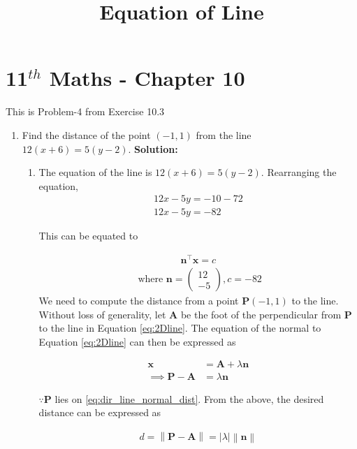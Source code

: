 \documentclass[12pt]{article}
\providecommand{\brak}[1]{\ensuremath{\left(#1\right)}}
\providecommand{\norm}[1]{\left\lVert#1\right\rVert}
\newcommand{\solution}{\noindent \textbf{Solution: }}
\newcommand{\myvec}[1]{\ensuremath{\begin{pmatrix}#1\end{pmatrix}}}
\providecommand{\abs}[1]{\left\vert#1\right\vert}
\let\vec\mathbf
\begin{document}
\begin{center}
\title{\textbf{Equation  of Line}}
\date{\vspace{-5ex}} %
\maketitle
\end{center}
\setcounter{page}{1}

\section{11$^{th}$ Maths - Chapter 10}
This is Problem-4 from Exercise 10.3
\begin{enumerate}
\item Find the distance of the point $(-1,1)$ from the line $12\brak{x+6} = 5\brak{y-2}$. 
\solution 
\begin{enumerate}
\item The equation of the line is $12\brak{x+6} = 5\brak{y-2}$. Rearranging the equation, 
\begin{align}
12x-5y = -10-72 \\
12x-5y = -82
\end{align}

This can be equated to

\begin{align}
	\label{eq:2Dline}
	\vec{n}^\top\vec{x} = c 
\end{align}
\begin{align}
	\text{ where }
		\vec{n} = \myvec{
	  12 \\
	  -5 
	  } ,   c = -82 
\end{align}
We need to compute the distance from a point $\vec{P}(-1,1)$ to the line. 
Without loss of generality, let $\vec{A}$ be the foot of the perpendicular from $\vec{P}$ to the line in Equation \eqref{eq:2Dline}. 
The equation of the normal to Equation \eqref{eq:2Dline} can then be expressed as 

\begin{align}
	\label{eq:dir_line_normal_dist}
	\vec{x} &= \vec{A} + \lambda \vec{n}
	\\
	\implies 
	\label{eq:dir_line_normal_dist_pa}
	\vec{P}- \vec{A} &=  \lambda \vec{n}
\end{align}

$\because \vec{P}$ lies on 
		\eqref{eq:dir_line_normal_dist}.
From the above, the desired distance can be expressed as 

\begin{align}
	\label{eq:dir_line_normal_dist_pa_d}
d = 	\norm{\vec{P}- \vec{A}}= \abs{\lambda} \norm{\vec{n}}
\end{align}


\end{enumerate}
\end{enumerate}
\end{document}
